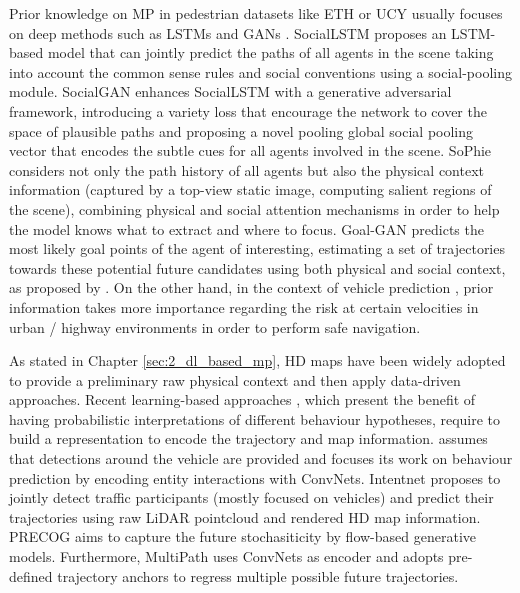 Prior knowledge on \ac{MP} in pedestrian datasets like ETH \cite{pellegrini2009you} or UCY \cite{lerner2007ucydata} usually focuses on deep methods such as \acp{LSTM} \cite{hochreiter1997long} and \acp{GAN} \cite{goodfellow2020generative}. SocialLSTM \cite{alahi2016social} proposes an \ac{LSTM}-based model that can jointly predict the paths of all agents in the scene taking into account the common sense rules and social conventions using a social-pooling module. SocialGAN \cite{gupta2018social} enhances SocialLSTM with a generative adversarial framework, introducing a variety loss that encourage the network to cover the space of plausible paths and proposing a novel pooling global social pooling vector that encodes the subtle cues for all agents involved in the scene. SoPhie \cite{sadeghian2019sophie} considers not only the path history of all agents but also the physical context information (captured by a top-view static image, computing salient regions of the scene), combining physical and social attention mechanisms in order to help the model knows what to extract and where to focus. Goal-GAN \cite{dendorfer2020goal} predicts the most likely goal points of the agent of interesting, estimating a set of trajectories towards these potential future candidates using both physical and social context, as proposed by \cite{sadeghian2019sophie}. On the other hand, in the context of vehicle prediction \cite{chang2019argoverse, caesar2020nuscenes}, prior information takes more importance regarding the risk at certain velocities in urban / highway environments in order to perform safe navigation.

As stated in Chapter \ref{sec:2_dl_based_mp}, HD maps have been widely adopted to provide a preliminary raw physical context and then apply data-driven approaches. Recent learning-based approaches \cite{hong2019rules, casas2018intentnet}, which present the benefit of having probabilistic interpretations of different behaviour hypotheses, require to build a representation to encode the trajectory and map information. \cite{hong2019rules} assumes that detections around the vehicle are provided and focuses its work on behaviour prediction by encoding entity interactions with ConvNets. Intentnet \cite{casas2018intentnet} proposes to jointly detect traffic participants (mostly focused on vehicles) and predict their trajectories using raw LiDAR pointcloud and rendered HD map information. PRECOG \cite{rhinehart2019precog} aims to capture the future stochasiticity by flow-based generative models. Furthermore, MultiPath \cite{chai2019multipath} uses ConvNets as encoder and adopts pre-defined trajectory anchors to regress multiple possible future trajectories. 

